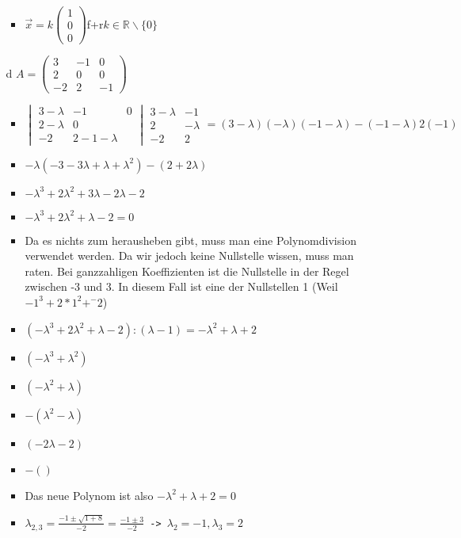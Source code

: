 \documentclass{article}
\newcommand{\R}{\mathbb{R}}
\begin{document}
\begin{itemize}
\begin{itemize}
\begin{itemize}
				\item{$\vec{x}=k \begin{pmatrix} 1 \\ 0 \\ 0 \end{pmatrix}$f+r$k\in\R\backslash\{0\}$}
			\end{itemize}
			\item[d]{$A=\begin{pmatrix} 3 & -1 & 0 \\ 2 & 0 & 0 \\ -2 & 2 & -1 \end{pmatrix}$}
			\begin{itemize}
				\item{$\begin{vmatrix} 3-\lambda & -1 & 0 \\ 2 -\lambda & 0 \\ -2 & 2 -1-\lambda \end{vmatrix}\begin{matrix} 3-\lambda & -1 \\ 2 & -\lambda \\ -2 & 2 \end{matrix}=(3-\lambda)(-\lambda)(-1-\lambda)-(-1-\lambda)2(-1)$}
				\item{$-\lambda(-3-3\lambda+\lambda+\lambda^2)-(2+2\lambda)$}
				\item{$-\lambda^3+2\lambda^2+3\lambda-2\lambda-2$}
				\item{$-\lambda^3+2\lambda^2+\lambda-2=0$}
				\item{Da es nichts zum herausheben gibt, muss man eine Polynomdivision verwendet werden. Da wir jedoch keine Nullstelle wissen, muss man raten. Bei ganzzahligen Koeffizienten ist die Nullstelle in der Regel zwischen -3 und 3. In diesem Fall ist eine der Nullstellen 1 (Weil $-1^3+2*1^2+^-2$)}
				\item{$(-\lambda^3+2\lambda^2+\lambda-2):(\lambda-1)=-\lambda^2+\lambda+2$}
				\item{$(-\lambda^3+\lambda^2)$}
				\item{$( - \lambda^2+\lambda)$}
				\item{$-(\lambda^2-\lambda)$}
				\item{$( - 2\lambda-2)$}
				\item{$-()$}
				\item{Das neue Polynom ist also $-\lambda^2+\lambda+2=0$}
				\item{$\lambda_{2,3}=\frac{-1\pm\sqrt{1+8}}{-2}=\frac{-1\pm3}{-2}$\texttt{ -> }$\lambda_2=-1, \lambda_3=2$}

\end{itemize}
\end{itemize}
\end{itemize}
\end{document}
